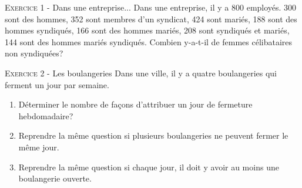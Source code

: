 

\newcommand{\mtn}{\mathbb{N}}
\newcommand{\mtns}{\mathbb{N}^*}
\newcommand{\mtz}{\mathbb{Z}}
\newcommand{\mtr}{\mathbb{R}}
\newcommand{\mtk}{\mathbb{K}}
\newcommand{\mtq}{\mathbb{Q}}
\newcommand{\mtc}{\mathbb{C}}
\newcommand{\mch}{\mathcal{H}}
\newcommand{\mcp}{\mathcal{P}}
\newcommand{\mcb}{\mathcal{B}}
\newcommand{\mcl}{\mathcal{L}}
\newcommand{\mcm}{\mathcal{M}}
\newcommand{\mcc}{\mathcal{C}}
\newcommand{\mcmn}{\mathcal{M}}
\newcommand{\mcmnr}{\mathcal{M}_n(\mtr)}
\newcommand{\mcmnk}{\mathcal{M}_n(\mtk)}
\newcommand{\mcsn}{\mathcal{S}_n}
\newcommand{\mcs}{\mathcal{S}}
\newcommand{\mcd}{\mathcal{D}}
\newcommand{\mcsns}{\mathcal{S}_n^{++}}
\newcommand{\glnk}{GL_n(\mtk)}
\newcommand{\mnr}{\mathcal{M}_n(\mtr)}
\DeclareMathOperator{\ch}{ch}
\DeclareMathOperator{\sh}{sh}
\DeclareMathOperator{\vect}{vect}
\DeclareMathOperator{\card}{card}
\DeclareMathOperator{\comat}{comat}
\DeclareMathOperator{\imv}{Im}
\DeclareMathOperator{\rang}{rg}
\DeclareMathOperator{\Fr}{Fr}
\DeclareMathOperator{\diam}{diam}
\DeclareMathOperator{\supp}{supp}
\newcommand{\veps}{\varepsilon}
\newcommand{\mcu}{\mathcal{U}}
\newcommand{\mcun}{\mcu_n}
\newcommand{\dis}{\displaystyle}
\newcommand{\croouv}{[\![}
\newcommand{\crofer}{]\!]}
\newcommand{\rab}{\mathcal{R}(a,b)}
\newcommand{\pss}[2]{\langle #1,#2\rangle}

 

\begin{center}\textsc{{\huge }}\end{center}



\vskip0.3cm\noindent\textsc{Exercice 1} - Dans une entreprise...
\vskip0.2cm
Dans une entreprise, il y a 800 employés. 300 sont des hommes, 352 sont membres d'un syndicat, 424 sont mariés, 188 sont des hommes syndiqués, 166 sont des hommes mariés, 208 sont syndiqués et mariés, 144 sont des hommes mariés syndiqués. Combien y-a-t-il de femmes célibataires non syndiquées?




\vskip0.3cm\noindent\textsc{Exercice 2} - Les boulangeries
\vskip0.2cm
Dans une ville, il y a quatre boulangeries qui ferment un jour par semaine.
\begin{enumerate}
\item Déterminer le nombre de façons d'attribuer un jour de fermeture hebdomadaire?
\item Reprendre la même question si plusieurs boulangeries ne peuvent fermer le même jour.
\item Reprendre la même question si chaque jour, il doit y avoir au moins une boulangerie ouverte.
\end{enumerate}


